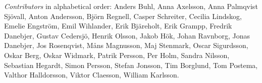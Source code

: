 \emph{Contributors} in alphabetical order:
Anders Buhl,
Anna Axelsson,
Anna Palmqvist Sjövall,
Anton Andersson,
Björn Regnell,
Casper Schreiter,
Cecilia Lindskog,
Emelie Engström,
Emil Wihlander,
Erik Bjäreholt,
Erik Grampp,
Fredrik Danebjer,
Gustav Cedersjö,
Henrik Olsson,
Jakob Hök,
Johan Ravnborg,
Jonas Danebjer,
Jos Rosenqvist,
Måns Magnusson,
Maj Stenmark,
Oscar Sigurdsson,
Oskar Berg,
Oskar Widmark,
Patrik Persson,
Per Holm,
Sandra Nilsson,
Sebastian Hegardt,
Simon Persson,
Stefan Jonsson,
Tim Borglund,
Tom Postema,
Valthor Halldorsson, 
Viktor Claesson,
William Karlsson.
